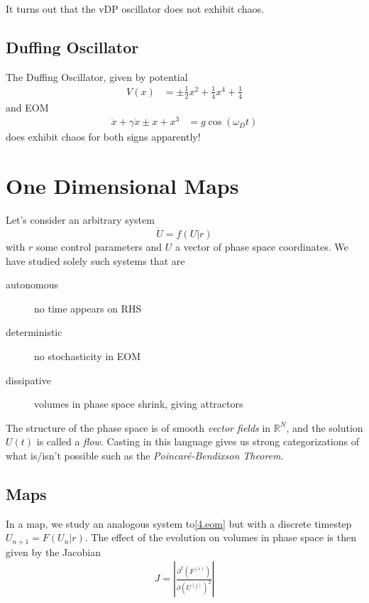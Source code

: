 \documentclass[10pt]{article}
\newcommand{\ptd}[2]{\frac{\partial^2 #1}{\partial#2^2}}
\newcommand{\abs}[1]{\left|#1\right|}
\begin{document}
It turns out that the vDP oscillator does not exhibit chaos.

\subsection{Duffing Oscillator}

The Duffing Oscillator, given by potential
\begin{align}
    V(x) &= \pm \frac{1}{2}x^2 + \frac{1}{4}x^4 + \frac{1}{4}
\end{align}
and EOM
\begin{align}
    \ddot{x} + \gamma \dot{x} \pm x + x^3 &= g\cos(\omega_D t)
\end{align}
does exhibit chaos for both signs apparently!

\clearpage

\section{One Dimensional Maps}

Let's consider an arbitrary system
\begin{equation}
    \dot{U} = f(U|r)\label{4.eom}
\end{equation}
with $r$ some control parameters and $U$ a vector of phase space coordinates. We
have studied solely such systems that are
\begin{description}
    \item[autonomous] no time appears on RHS
    \item[deterministic] no stochasticity in EOM
    \item[dissipative] volumes in phase space shrink, giving attractors
\end{description}

The structure of the phase space is of smooth \emph{vector fields} in
$\mathbb{R}^N$, and the solution $U(t)$ is called a \emph{flow}. Casting in this
language gives us strong categorizations of what is/isn't possible such as the
\emph{Poincar\'e-Bendixson Theorem}.

\subsection{Maps}

In a map, we study an analogous system to\eqref{4.eom} but with a discrete
timestep $U_{n+1} = F(U_n|r)$. The effect of the evolution on volumes in phase
space is then given by the Jacobian
\begin{align}
    J = \abs{\ptd{(F^{(i)})}{(U^{(j)})}}
\end{align}
\end{document}
